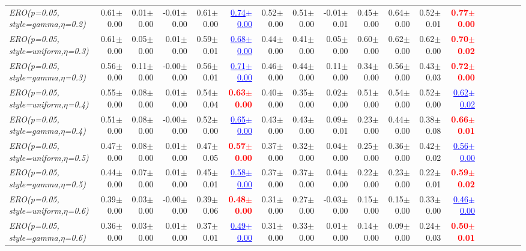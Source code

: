 \documentclass[nohyperref]{article}
\theoremstyle{plain}
\theoremstyle{definition}
\theoremstyle{remark}
\newcommand{\red}[1]{\textcolor{red}{\textbf{#1}}}
\newcommand{\blue}[1]{\textcolor{blue}{\underline{#1}}}
\begin{document}
\begin{table*}[!ht]
{\begin{tabular}{lrrrrrrrrrrrrrrrrr}
			{\it ERO(p=0.05, style=gamma,$\eta$=0.2)} & 0.61$\pm$0.00 & 0.01$\pm$0.00 & -0.01$\pm$0.00 & 0.61$\pm$0.00 & \blue{0.74$\pm$0.00} & 0.52$\pm$0.00 & 0.51$\pm$0.00 & -0.01$\pm$0.01 & 0.45$\pm$0.00 & 0.64$\pm$0.00 & 0.52$\pm$0.01 & \red{0.77$\pm$0.00} \\
			{\it ERO(p=0.05, style=uniform,$\eta$=0.3)} & 0.61$\pm$0.00 & 0.05$\pm$0.00 & 0.01$\pm$0.00 & 0.59$\pm$0.01 & \blue{0.68$\pm$0.00} & 0.44$\pm$0.00 & 0.41$\pm$0.00 & 0.05$\pm$0.00 & 0.60$\pm$0.00 & 0.62$\pm$0.00 & 0.62$\pm$0.00 & \red{0.70$\pm$0.02} \\
			{\it ERO(p=0.05, style=gamma,$\eta$=0.3)} & 0.56$\pm$0.00 & 0.11$\pm$0.00 & -0.00$\pm$0.00 & 0.56$\pm$0.01 & \blue{0.71$\pm$0.00} & 0.46$\pm$0.00 & 0.44$\pm$0.00 & 0.11$\pm$0.00 & 0.34$\pm$0.00 & 0.56$\pm$0.00 & 0.43$\pm$0.03 & \red{0.72$\pm$0.00} \\
			{\it ERO(p=0.05, style=uniform,$\eta$=0.4)} & 0.55$\pm$0.00 & 0.08$\pm$0.00 & 0.01$\pm$0.00 & 0.54$\pm$0.04 & \red{0.63$\pm$0.00} & 0.40$\pm$0.00 & 0.35$\pm$0.00 & 0.02$\pm$0.00 & 0.51$\pm$0.00 & 0.54$\pm$0.00 & 0.52$\pm$0.00 & \blue{0.62$\pm$0.02} \\
			{\it ERO(p=0.05, style=gamma,$\eta$=0.4)} & 0.51$\pm$0.00 & 0.08$\pm$0.00 & -0.00$\pm$0.00 & 0.52$\pm$0.00 & \blue{0.65$\pm$0.00} & 0.43$\pm$0.00 & 0.43$\pm$0.00 & 0.09$\pm$0.01 & 0.23$\pm$0.00 & 0.44$\pm$0.00 & 0.38$\pm$0.08 & \red{0.66$\pm$0.01} \\
			{\it ERO(p=0.05, style=uniform,$\eta$=0.5)} & 0.47$\pm$0.00 & 0.08$\pm$0.00 & 0.01$\pm$0.00 & 0.47$\pm$0.05 & \red{0.57$\pm$0.00} & 0.37$\pm$0.00 & 0.32$\pm$0.00 & 0.04$\pm$0.00 & 0.25$\pm$0.00 & 0.36$\pm$0.00 & 0.42$\pm$0.02 & \blue{0.56$\pm$0.00} \\
			{\it ERO(p=0.05, style=gamma,$\eta$=0.5)} & 0.44$\pm$0.00 & 0.07$\pm$0.00 & 0.01$\pm$0.00 & 0.45$\pm$0.01 & \blue{0.58$\pm$0.00} & 0.37$\pm$0.00 & 0.37$\pm$0.00 & 0.04$\pm$0.00 & 0.22$\pm$0.00 & 0.23$\pm$0.00 & 0.22$\pm$0.01 & \red{0.59$\pm$0.02} \\
			{\it ERO(p=0.05, style=uniform,$\eta$=0.6)} & 0.39$\pm$0.00 & 0.03$\pm$0.00 & -0.00$\pm$0.00 & 0.39$\pm$0.06 & \red{0.48$\pm$0.00} & 0.31$\pm$0.00 & 0.27$\pm$0.00 & -0.03$\pm$0.00 & 0.15$\pm$0.00 & 0.15$\pm$0.00 & 0.33$\pm$0.00 & \blue{0.46$\pm$0.00} \\
			{\it ERO(p=0.05, style=gamma,$\eta$=0.6)} & 0.36$\pm$0.00 & 0.03$\pm$0.00 & 0.01$\pm$0.00 & 0.37$\pm$0.01 & \blue{0.49$\pm$0.00} & 0.31$\pm$0.00 & 0.33$\pm$0.00 & 0.01$\pm$0.00 & 0.14$\pm$0.00 & 0.09$\pm$0.00 & 0.24$\pm$0.03 & \red{0.50$\pm$0.01} \\

\end{tabular}}
\end{table*}
\end{document}
